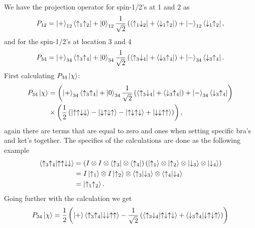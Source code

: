 \documentclass[a4paper,10pt]{article}
\begin{document}
\subsection{ }
We have the projection operator for spin-1/2's at 1 and 2 as
%
\begin{align*}
P_{12} = \ket{+}_{12}\bra{\uparrow_1 \uparrow_2} + \ket{0}_{12}\frac{1}{\sqrt{2}}\left(\bra{\uparrow_1\downarrow_2} + \bra{\downarrow_1\uparrow_2}\right) + \ket{-}_{12}\bra{\downarrow_1\uparrow_2},
\end{align*}
% 
and for the spin-1/2's at location 3 and 4
%
\begin{align*}
P_{34} = \ket{+}_{34} \bra{\uparrow_3\uparrow_4} + \ket{0}_{34} \frac{1}{\sqrt{2}} \left(\bra{\uparrow_3 \downarrow_4} + \bra{\downarrow_3 \uparrow_4}\right) + \ket{-}_{34}\bra{\downarrow_3\uparrow_4}.
\end{align*}
%
First calculating $P_{34}\ket{\chi}$:
%
\begin{align*}
P_{34}\ket{\chi} &= \left(\ket{+}_{34} \bra{\uparrow_3\uparrow_4} + \ket{0}_{34} \frac{1}{\sqrt{2}} \left(\bra{\uparrow_3 \downarrow_4} + \bra{\downarrow_3 \uparrow_4}\right) + \ket{-}_{34}\bra{\downarrow_3\uparrow_4}\right) \\
&\times  \left(\frac{1}{2}\left( \ket{\uparrow\uparrow\downarrow\downarrow} - \ket{\downarrow\uparrow\downarrow\uparrow} - \ket{\uparrow\downarrow\uparrow\downarrow} + \ket{\downarrow\downarrow\uparrow\uparrow}\right)\right),
\end{align*}
%
again there are terms that are equal to zero and ones when setting specific bra's and ket's together. The specifics of the calculations are done as the following example
%
\begin{align*}
\braket{\uparrow_3\uparrow_4}{\uparrow\uparrow\downarrow\downarrow} &= \left(I \otimes I \otimes \bra{\uparrow_3} \otimes \bra{\uparrow_4}\right) \left( \ket{\uparrow_1} \otimes \ket{\uparrow_2} \otimes \ket{\downarrow_3} \otimes \ket{\downarrow_4}\right) \\
&= I\ket{\uparrow_1} \otimes I\ket{\uparrow_2} \otimes \braket{\uparrow_3}{\downarrow_3} \otimes \braket{\uparrow_4}{\downarrow_4} \\
&= \ket{\uparrow_1 \uparrow_2}.
\end{align*}
%
Going further with the calculation we get
%
\begin{align*}
P_{34}\ket{\chi} = \frac{1}{2}\left( \ket{+}\braket{\uparrow_3\uparrow_4}{\downarrow\downarrow\uparrow\uparrow} - \frac{1}{\sqrt{2}}\left(\braket{\uparrow_3 \downarrow_4}{\uparrow\downarrow\uparrow\downarrow} + \braket{\downarrow_3 \uparrow_4}{\downarrow\uparrow\downarrow\uparrow} \right)\right)
\end{align*}
\end{document}
